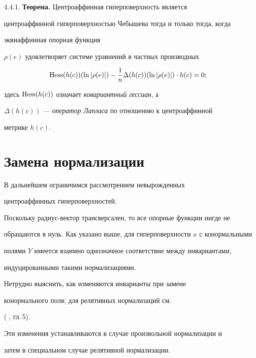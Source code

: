 \medskip





4.4.1. {\bf Теорема.} Центроаффинная гиперповерхность является


центроаффинной гиперповерхностью Чебышева тогда и только тогда, когда


эквиаффинная опорная функция


$\rho (e)$ удовлетворяет системе уравнений в частных производных


$$


\Hess (h(c)) (\ln |\rho (e)|) - \frac {1}{n} \Delta (h(c))


(\ln |\rho (e)|)\cdot h(c) = 0;


$$


здесь $\operatorname{Hess} (h(c))$ означает {\it ковариантный гессиан}, а


$\Delta (h(c))$ --- {\it оператор Лапласа} по отношению к центроаффинной


метрике $h(c)$.








\section{Замена нормализации}





В дальнейшем ограничимся рассмотрением невырожденных


центроаффинных гиперповерхностей.


Поскольку радиус-вектор трансверсален, то все опорные функции нигде не


обращаются в нуль. Как указано выше, для гиперповерхности $x$ с конормальными 


полями $Y$ имеется взаимно однозначное соответствие между инвариантами,


индуцированными такими нормализациями.


Нетрудно выяснить, как изменяются инварианты при замене


конормального поля; для релятивных нормализаций см.


( \cite{SIM-S-V}, гл.\,5).


Эти изменения устанавливаются в случае произвольной нормализации и


затем в специальном случае релятивной нормализации.





